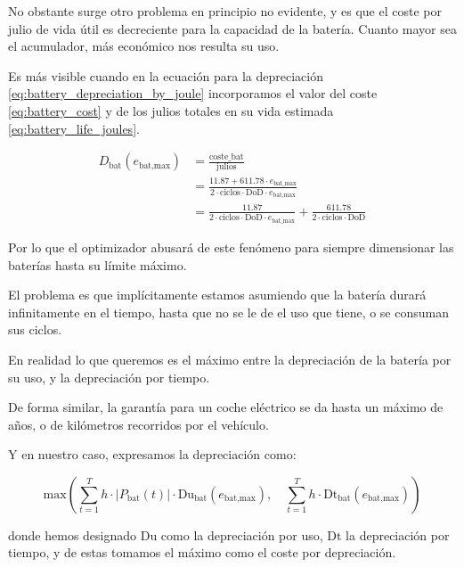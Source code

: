 No obstante surge otro problema en principio no evidente, y es que el coste por
julio de vida útil es decreciente para la capacidad de la batería. Cuanto mayor
sea el acumulador, más económico nos resulta su uso.

Es más visible cuando en la ecuación para la depreciación
\eqref{eq:battery_depreciation_by_joule} incorporamos el valor del coste
\eqref{eq:battery_cost} y de los julios totales en su vida estimada
\eqref{eq:battery_life_joules}.

\begin{align}
	D_\text{bat}(e_\text{bat,max}) & = \frac{\text{coste\_bat}}{\text{julios}} \nonumber                                                                                       \\
	                               & = \frac{11.87 + 611.78 \cdot e_{\text{bat\_max}}}{2 \cdot \text{ciclos} \cdot \text{DoD} \cdot e_\text{bat,max}} \nonumber                \\
	                               & = \frac{11.87}{2 \cdot \text{ciclos} \cdot \text{DoD} \cdot e_{\text{bat\_max}}} +  \frac{611.78}{2 \cdot \text{ciclos} \cdot \text{DoD}}
\end{align}

Por lo que el optimizador abusará de este fenómeno para siempre dimensionar las
baterías hasta su límite máximo.

El problema es que implícitamente estamos asumiendo que la batería durará
infinitamente en el tiempo, hasta que no se le de el uso que tiene, o se
consuman sus ciclos.

En realidad lo que queremos es el máximo entre la depreciación de la batería
por su uso, y la depreciación por tiempo.

De forma similar, la garantía para un coche eléctrico se da hasta un máximo de
años, o de kilómetros recorridos por el vehículo.

Y en nuestro caso, expresamos la depreciación como:

\begin{equation}
	\text{max} \left( \sum_{t=1}^{T} h \cdot |P_\text{bat}(t)| \cdot \text{Du}_\text{bat}(e_\text{bat,max}), \quad \sum_{t=1}^{T} h \cdot \text{Dt}_\text{bat}(e_\text{bat,max}) \right)
\end{equation}

donde hemos designado $\text{Du}$ como la depreciación por uso, $\text{Dt}$ la
depreciación por tiempo, y de estas tomamos el máximo como el coste por
depreciación.

